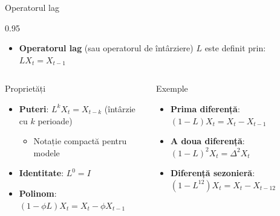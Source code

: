 \documentclass[9pt, aspectratio=169, t]{beamer}
\begin{document}
\begin{frame}{Operatorul lag}
    \begin{cminipage}{0.95\textwidth}
        \begin{defn}
            \begin{itemize}\setlength{\itemsep}{0pt}
                \item \textbf{Operatorul lag} (sau operatorul de întârziere) $L$ este definit prin: $LX_t = X_{t-1}$
            \end{itemize}
        \end{defn}

        \begin{columns}[T]
            \begin{block}{Proprietăți}
                \begin{itemize}\setlength{\itemsep}{0pt}
                    \item \textbf{Puteri}: $L^k X_t = X_{t-k}$ (întârzie cu $k$ perioade)
                    \begin{itemize}
                        \item Notație compactă pentru modele
                    \end{itemize}
                    \item \textbf{Identitate}: $L^0 = I$
                    \item \textbf{Polinom}: $(1 - \phi L)X_t = X_t - \phi X_{t-1}$
                \end{itemize}
            \end{block}
            \begin{exampleblock}{Exemple}
                \begin{itemize}\setlength{\itemsep}{0pt}
                    \item \textbf{Prima diferență}: $(1-L)X_t = X_t - X_{t-1}$
                    \item \textbf{A doua diferență}: $(1-L)^2 X_t = \Delta^2 X_t$
                    \item \textbf{Diferență sezonieră}: $(1-L^{12})X_t = X_t - X_{t-12}$
                \end{itemize}
            \end{exampleblock}
        \end{columns}
    \end{cminipage}
\end{frame}
\end{document}
